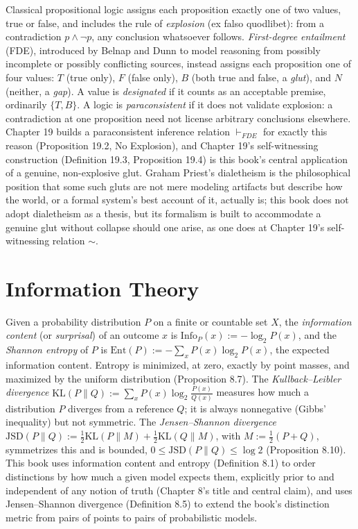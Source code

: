 \documentclass[11pt]{book}
\begin{document}
Classical propositional logic assigns each proposition exactly one of two values, true or false, and includes the rule of \emph{explosion} (ex falso quodlibet): from a contradiction $p \wedge \neg p$, any conclusion whatsoever follows. \emph{First-degree entailment} (FDE), introduced by Belnap and Dunn to model reasoning from possibly incomplete or possibly conflicting sources, instead assigns each proposition one of four values: $T$ (true only), $F$ (false only), $B$ (both true and false, a \emph{glut}), and $N$ (neither, a \emph{gap}). A value is \emph{designated} if it counts as an acceptable premise, ordinarily $\{T,B\}$. A logic is \emph{paraconsistent} if it does not validate explosion: a contradiction at one proposition need not license arbitrary conclusions elsewhere. Chapter 19 builds a paraconsistent inference relation $\vdash_{FDE}$ for exactly this reason (Proposition 19.2, No Explosion), and Chapter 19's self-witnessing construction (Definition 19.3, Proposition 19.4) is this book's central application of a genuine, non-explosive glut. Graham Priest's dialetheism is the philosophical position that some such gluts are not mere modeling artifacts but describe how the world, or a formal system's best account of it, actually is; this book does not adopt dialetheism as a thesis, but its formalism is built to accommodate a genuine glut without collapse should one arise, as one does at Chapter 19's self-witnessing relation $\sim$.

\section*{Information Theory}

Given a probability distribution $P$ on a finite or countable set $X$, the \emph{information content} (or \emph{surprisal}) of an outcome $x$ is $\mathrm{Info}_P(x) := -\log_2 P(x)$, and the \emph{Shannon entropy} of $P$ is $\mathrm{Ent}(P) := -\sum_x P(x)\log_2 P(x)$, the expected information content. Entropy is minimized, at zero, exactly by point masses, and maximized by the uniform distribution (Proposition 8.7). The \emph{Kullback--Leibler divergence} $\mathrm{KL}(P\|Q) := \sum_x P(x)\log_2\frac{P(x)}{Q(x)}$ measures how much a distribution $P$ diverges from a reference $Q$; it is always nonnegative (Gibbs' inequality) but not symmetric. The \emph{Jensen--Shannon divergence} $\mathrm{JSD}(P\|Q) := \tfrac12\mathrm{KL}(P\|M) + \tfrac12\mathrm{KL}(Q\|M)$, with $M := \tfrac12(P+Q)$, symmetrizes this and is bounded, $0 \leq \mathrm{JSD}(P\|Q) \leq \log 2$ (Proposition 8.10). This book uses information content and entropy (Definition 8.1) to order distinctions by how much a given model expects them, explicitly prior to and independent of any notion of truth (Chapter 8's title and central claim), and uses Jensen--Shannon divergence (Definition 8.5) to extend the book's distinction metric from pairs of points to pairs of probabilistic models.
\end{document}
